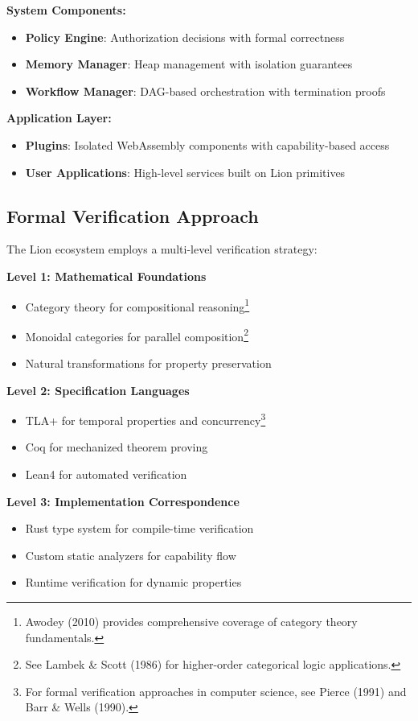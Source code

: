 \textbf{System Components:}
\begin{itemize}
\item \textbf{Policy Engine}: Authorization decisions with formal correctness
\item \textbf{Memory Manager}: Heap management with isolation guarantees
\item \textbf{Workflow Manager}: DAG-based orchestration with termination proofs
\end{itemize}

\textbf{Application Layer:}
\begin{itemize}
\item \textbf{Plugins}: Isolated WebAssembly components with capability-based access
\item \textbf{User Applications}: High-level services built on Lion primitives
\end{itemize}

\subsection{Formal Verification Approach}

The Lion ecosystem employs a multi-level verification strategy:

\textbf{Level 1: Mathematical Foundations}
\begin{itemize}
\item Category theory for compositional reasoning\footnote{Awodey (2010) provides comprehensive coverage of category theory fundamentals.}
\item Monoidal categories for parallel composition\footnote{See Lambek \& Scott (1986) for higher-order categorical logic applications.}
\item Natural transformations for property preservation
\end{itemize}

\textbf{Level 2: Specification Languages}
\begin{itemize}
\item TLA+ for temporal properties and concurrency\footnote{For formal verification approaches in computer science, see Pierce (1991) and Barr \& Wells (1990).}
\item Coq for mechanized theorem proving
\item Lean4 for automated verification
\end{itemize}

\textbf{Level 3: Implementation Correspondence}
\begin{itemize}
\item Rust type system for compile-time verification
\item Custom static analyzers for capability flow
\item Runtime verification for dynamic properties
\end{itemize}

